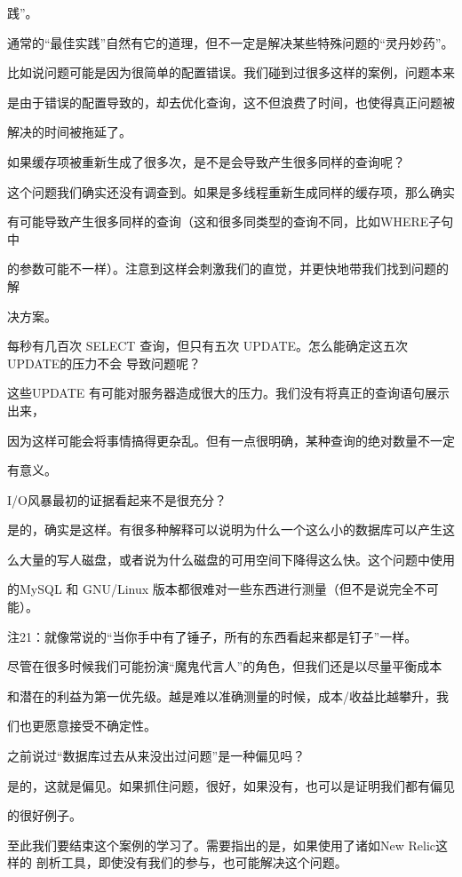 {践”。

通常的“最佳实践”自然有它的道理，但不一定是解决某些特殊问题的“灵丹妙药”。

比如说问题可能是因为很简单的配置错误。我们碰到过很多这样的案例，问题本来

是由于错误的配置导致的，却去优化查询，这不但浪费了时间，也使得真正问题被

解决的时间被拖延了。

如果缓存项被重新生成了很多次，是不是会导致产生很多同样的查询呢？

这个问题我们确实还没有调查到。如果是多线程重新生成同样的缓存项，那么确实

有可能导致产生很多同样的查询（这和很多同类型的查询不同，比如WHERE子句中

的参数可能不一样）。注意到这样会刺激我们的直觉，并更快地带我们找到问题的解

决方案。

每秒有几百次 SELECT 查询，但只有五次 UPDATE。怎么能确定这五次 UPDATE的压力不会
导致问题呢？

这些UPDATE 有可能对服务器造成很大的压力。我们没有将真正的查询语句展示出来，

因为这样可能会将事情搞得更杂乱。但有一点很明确，某种查询的绝对数量不一定

有意义。

I/O风暴最初的证据看起来不是很充分？

是的，确实是这样。有很多种解释可以说明为什么一个这么小的数据库可以产生这

么大量的写人磁盘，或者说为什么磁盘的可用空间下降得这么快。这个问题中使用

的MySQL 和 GNU/Linux 版本都很难对一些东西进行测量（但不是说完全不可能）。

注21：就像常说的“当你手中有了锤子，所有的东西看起来都是钉子”一样。

尽管在很多时候我们可能扮演“魔鬼代言人”的角色，但我们还是以尽量平衡成本

和潜在的利益为第一优先级。越是难以准确测量的时候，成本/收益比越攀升，我

们也更愿意接受不确定性。

之前说过“数据库过去从来没出过问题”是一种偏见吗？

是的，这就是偏见。如果抓住问题，很好，如果没有，也可以是证明我们都有偏见

的很好例子。

至此我们要结束这个案例的学习了。需要指出的是，如果使用了诸如New Relic这样的
剖析工具，即使没有我们的参与，也可能解决这个问题。

}
